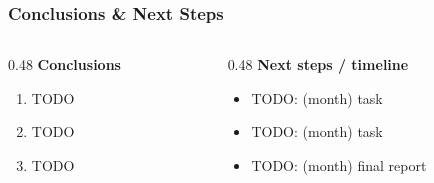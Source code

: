 
\begin{frame}
	\frametitle{Conclusions \& Next Steps}

	\begin{columns}[T]
		\begin{column}{0.48\linewidth}
			\textbf{Conclusions}
			\begin{enumerate}
				\item TODO
				\item TODO
				\item TODO
			\end{enumerate}
		\end{column}
		\begin{column}{0.48\linewidth}
			\textbf{Next steps / timeline}
			\begin{itemize}
				\item TODO: (month) task
				\item TODO: (month) task
				\item TODO: (month) final report
			\end{itemize}
		\end{column}
	\end{columns}
\end{frame}
